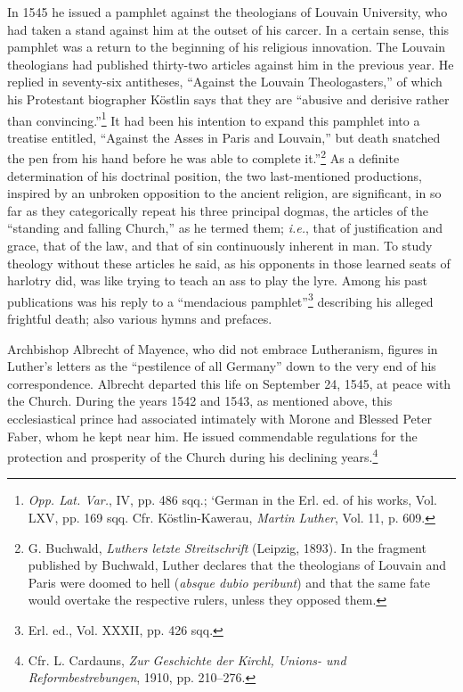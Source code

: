 In 1545 he issued a pamphlet against the theologians of Louvain
University, who had taken a stand against him at the outset of his
carcer. In a certain sense, this pamphlet was a return to the beginning
of his religious innovation. The Louvain theologians had published thirty-two
articles against him in the previous year. He replied in seventy-six antitheses,
“Against the Louvain Theologasters,”
of which his Protestant biographer Köstlin says that they are “abusive
and derisive rather than convincing.”\footnote
{\textit{Opp. Lat. Var.}, IV, pp. 486 sqq.; ‘German in the Erl. ed. of his works, Vol. LXV, pp.
169 sqq. Cfr. Köstlin-Kawerau, \textit{Martin Luther}, Vol. 11, p. 609.}
It had been his intention to
expand this pamphlet into a treatise entitled, “Against the Asses in
Paris and Louvain,” but death snatched the pen from his hand before
he was able to complete it.”\footnote
{G. Buchwald, \textit{Luthers letzte Streitschrift} (Leipzig, 1893). In the fragment published
by Buchwald, Luther declares that the theologians of Louvain and Paris were doomed to
hell (\textit{absque dubio peribunt}) and that the same fate would overtake the respective rulers,
unless they opposed them.}
As a definite determination of his doctrinal
position, the two last-mentioned productions, inspired by an
unbroken opposition to the ancient religion, are significant, in so far
as they categorically repeat his three principal dogmas, the articles
of the “standing and falling Church,” as he termed them; \textit{i.e.}, that
of justification and grace, that of the law, and that of sin continuously
inherent in man. To study theology without these articles he said,
as his opponents in those learned seats of harlotry did, was like trying
to teach an ass to play the lyre. Among his past publications was
his reply to a “mendacious pamphlet”\footnote{Erl. ed., Vol. XXXII, pp. 426 sqq.}
 describing his alleged frightful
death; also various hymns and prefaces.

Archbishop Albrecht of Mayence, who did not embrace Lutheranism, figures
in Luther’s letters as the “pestilence of all Germany”
down to the very end of his correspondence. Albrecht departed this
life on September 24, 1545, at peace with the Church. During the
years 1542 and 1543, as mentioned above, this ecclesiastical prince
had associated intimately with Morone and Blessed Peter Faber, whom
he kept near him. He issued commendable regulations for the protection
and prosperity of the Church during his declining years.\footnote
{Cfr. L. Cardauns, \textit{Zur Geschichte der Kirchl, Unions- und Reformbestrebungen}, 1910,
pp. 210--276.}

